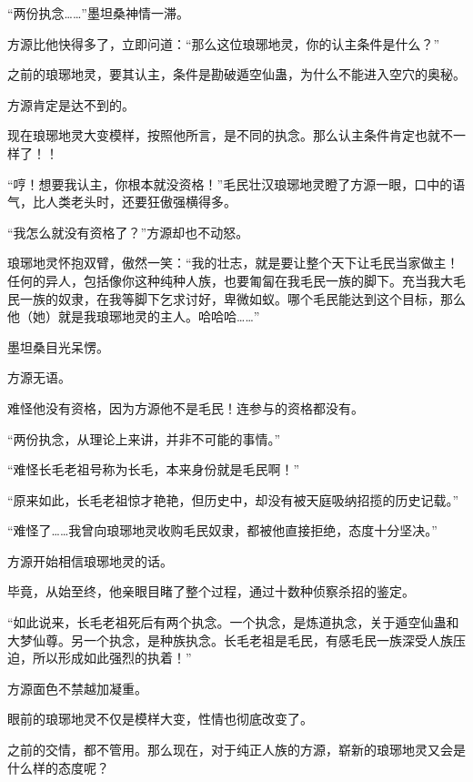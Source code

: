 \begin{this_body}
“两份执念……”墨坦桑神情一滞。

方源比他快得多了，立即问道：“那么这位琅琊地灵，你的认主条件是什么？”

之前的琅琊地灵，要其认主，条件是勘破遁空仙蛊，为什么不能进入空穴的奥秘。

方源肯定是达不到的。

现在琅琊地灵大变模样，按照他所言，是不同的执念。那么认主条件肯定也就不一样了！！

“哼！想要我认主，你根本就没资格！”毛民壮汉琅琊地灵瞪了方源一眼，口中的语气，比人类老头时，还要狂傲强横得多。

“我怎么就没有资格了？”方源却也不动怒。

琅琊地灵怀抱双臂，傲然一笑：“我的壮志，就是要让整个天下让毛民当家做主！任何的异人，包括像你这种纯种人族，也要匍匐在我毛民一族的脚下。充当我大毛民一族的奴隶，在我等脚下乞求讨好，卑微如蚁。哪个毛民能达到这个目标，那么他（她）就是我琅琊地灵的主人。哈哈哈……”

墨坦桑目光呆愣。

方源无语。

难怪他没有资格，因为方源他不是毛民！连参与的资格都没有。

“两份执念，从理论上来讲，并非不可能的事情。”

“难怪长毛老祖号称为长毛，本来身份就是毛民啊！”

“原来如此，长毛老祖惊才艳艳，但历史中，却没有被天庭吸纳招揽的历史记载。”

“难怪了……我曾向琅琊地灵收购毛民奴隶，都被他直接拒绝，态度十分坚决。”

方源开始相信琅琊地灵的话。

毕竟，从始至终，他亲眼目睹了整个过程，通过十数种侦察杀招的鉴定。

“如此说来，长毛老祖死后有两个执念。一个执念，是炼道执念，关于遁空仙蛊和大梦仙尊。另一个执念，是种族执念。长毛老祖是毛民，有感毛民一族深受人族压迫，所以形成如此强烈的执着！”

方源面色不禁越加凝重。

眼前的琅琊地灵不仅是模样大变，性情也彻底改变了。

之前的交情，都不管用。那么现在，对于纯正人族的方源，崭新的琅琊地灵又会是什么样的态度呢？

\end{this_body}

